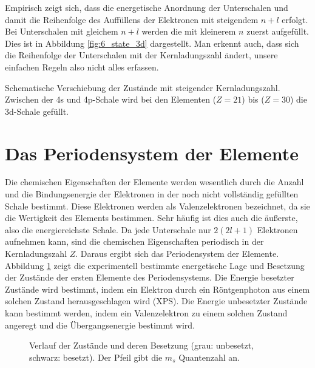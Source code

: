 Empirisch zeigt sich, dass die energetische Anordnung der Unterschalen und damit die Reihenfolge des Auffüllens der Elektronen mit steigendem $n+l$ erfolgt. Bei Unterschalen mit gleichem $n+l$ werden die mit kleinerem $n$ zuerst aufgefüllt. Dies ist in Abbildung  \ref{fig:6_state_3d} dargestellt. Man erkennt auch, dass sich die Reihenfolge der Unterschalen mit der Kernladungszahl ändert, unsere einfachen Regeln also nicht alles erfassen.


\begin{marginfigure}
    \caption{Schematische Verschiebung der Zustände mit steigender Kernladungszahl. Zwischen der 4s und 4p-Schale wird bei den Elementen   ($Z=21$) bis  ($Z=30$) die 3d-Schale gefüllt.}
    \label{fig:6_state_3d}
\end{marginfigure}

\section{Das Periodensystem der Elemente}

Die chemischen Eigenschaften der Elemente werden wesentlich durch die Anzahl und die Bindungsenergie der Elektronen in der noch nicht vollständig gefüllten Schale bestimmt. Diese Elektronen werden als Valenzelektronen bezeichnet, da sie die Wertigkeit des Elements bestimmen. Sehr häufig ist dies auch die äußerste, also die energiereichste Schale. Da jede Unterschale nur $2 (2l +1)$ Elektronen aufnehmen kann, sind die chemischen Eigenschaften periodisch in der Kernladungszahl $Z$. Daraus ergibt sich das Periodensystem der Elemente. Abbildung \ref{fig:6_PSE_states} zeigt die experimentell bestimmte energetische Lage und Besetzung der Zustände der ersten Elemente des Periodensystems. Die Energie besetzter Zustände wird bestimmt, indem ein Elektron durch ein Röntgenphoton aus einem solchen Zustand herausgeschlagen wird (XPS). Die Energie unbesetzter Zustände kann bestimmt werden, indem ein Valenzelektron zu einem solchen Zustand angeregt und die Übergangsenergie bestimmt wird.

\begin{figure}
    \caption{Verlauf der Zustände und deren Besetzung (grau: unbesetzt, schwarz: besetzt). Der Pfeil gibt die $m_s$ Quantenzahl an.}
    \label{fig:6_PSE_states}
\end{figure}

